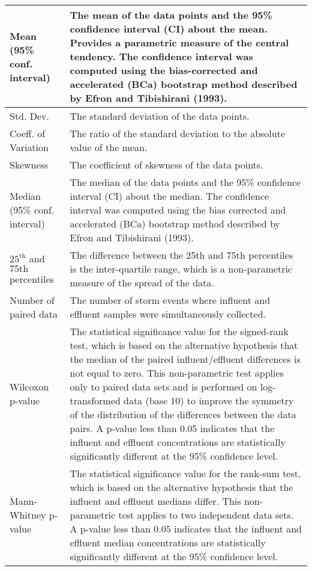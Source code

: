 \begin{longtable}[pt]{p{1.5in} p{4in}}
    \midrule
    Mean (95\% conf. interval) & The mean of the data points and the 95\%
    confidence interval (CI) about the mean.  Provides a parametric measure of
    the central tendency. The confidence interval was computed using the
    bias-corrected and accelerated (BCa) bootstrap method described by
    Efron and Tibishirani (1993)\footnotemark[5].\\

    \midrule
    Std. Dev. & The standard deviation of the data points. \\

    \midrule
    Coeff. of Variation & The ratio of the standard deviation to the absolute
    value of the mean. \\

    \midrule
    Skewness & The coefficient of skewness of the data points.  \\

    \midrule
    Median (95\% conf. interval)  & The median of the data points and the 95\%
    confidence interval (CI) about the median. The confidence interval was
    computed using the bias corrected and accelerated (BCa) bootstrap method
    described by Efron and Tibishirani (1993)\footnotemark[5].   \\

    \midrule
    $25^{\mathrm{th}}$ and $75{\mathrm{th}}$ percentiles & The difference
    between the 25th and 75th percentiles is the inter-quartile range, which is
    a non-parametric measure of the spread of the data.  \\

    \midrule
    Number of paired data & The number of storm events where influent and
    effluent samples were simultaneously collected.\\

    \midrule
    Wilcoxon p-value & The statistical significance value for the signed-rank
    test, which is based on the alternative hypothesis that the median of the
    paired influent/effluent differences is not equal to zero.  This
    non-parametric test applies only to paired data sets and is performed on
    log-transformed data (base 10) to improve the symmetry of the distribution
    of the differences between the data pairs.  A p-value less than 0.05
    indicates that the influent and effluent concentrations are statistically
    significantly different at the 95\% confidence level. \\

    \midrule
    Mann-Whitney p-value & The statistical significance value for the rank-sum
    test, which is based on the alternative hypothesis that the influent and
    effluent medians differ. This non-parametric test applies to two
    independent data sets.  A p-value less than 0.05 indicates that the
    influent and effluent median concentrations are statistically significantly
    different at the 95\% confidence level.\\


\end{longtable}
